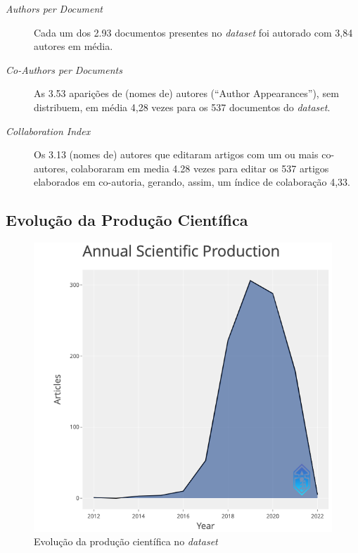 \begin{description}
    \item [\textit{Authors per Document}] Cada um dos 2.93 documentos presentes no \textit{dataset} foi autorado com 3,84 autores em média.
    \item [\textit{Co-Authors per Documents}] As 3.53 aparições de (nomes de) autores (``Author Appearances''), sem distribuem, em média 4,28 vezes para os 537 documentos do \textit{dataset}.
    \item [\textit{Collaboration Index}] Os 3.13 (nomes de) autores que editaram artigos com um ou mais co-autores, colaboraram em media 4.28 vezes para editar os 537 artigos elaborados em co-autoria, gerando, assim, um índice de colaboração 4,33. 
\end{description}

\subsection{Evolução da Produção Científica}

\begin{figure}
    \centering
    \includegraphics[width=1\textwidth]{experiments/Jaxiii/PesquisaBibliometrica/Blockchains/annual-plot.png}
    \caption{Evolução da produção científica no \textit{dataset}}
    \label{fig:evol:anual:blockchain@Jaxiii}
\end{figure}

